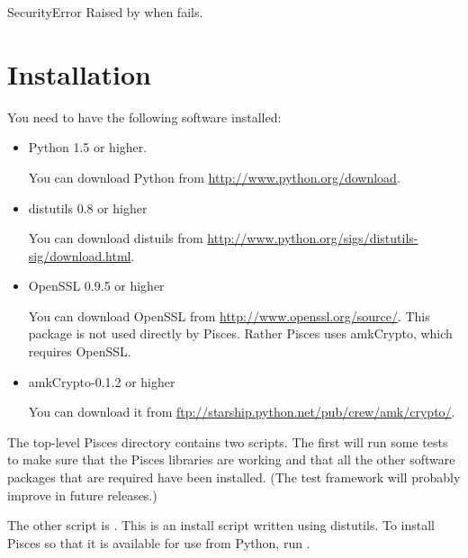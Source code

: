 \documentclass{howto}
\begin{document}
\begin{classdesc}{SecurityError}{}
Raised by  when  fails.
\end{classdesc}

\appendix

\section{Installation}

You need to have the following software installed:

\begin{itemize}
  \item  Python 1.5 or higher.

You can download Python from \url{http://www.python.org/download}.

  \item  distutils 0.8 or higher

You can download distuils from
\url{http://www.python.org/sigs/distutils-sig/download.html}.

  \item  OpenSSL 0.9.5 or higher

You can download OpenSSL from \url{http://www.openssl.org/source/}.
This package is not used directly by Pisces.  Rather Pisces uses
amkCrypto, which requires OpenSSL.

  \item  amkCrypto-0.1.2 or higher

You can download it from
\url{ftp://starship.python.net/pub/crew/amk/crypto/}.

\end{itemize}

The top-level Pisces directory contains two scripts.  The first
 will run some tests to make sure that the Pisces
libraries are working and that all the other software packages that
are required have been installed.  (The test framework will probably
improve in future releases.)

The other script is .  This is an install script
written using distutils.  To install Pisces so that it is available
for use from Python, run .



\end{document}
